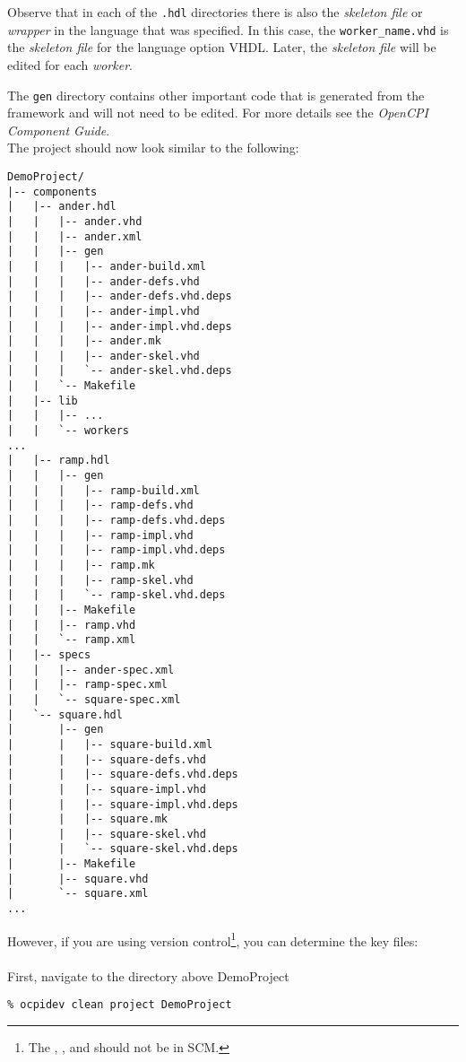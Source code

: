 Observe that in each of the \verb+.hdl+ directories there is also the \textit{skeleton file} or \textit{wrapper} in the language that was specified. In this case, the \verb+worker_name.vhd+ is the \textit{skeleton file} for the language option VHDL. Later, the \textit{skeleton file} will be edited for each \textit{worker}.\newline

The \verb+gen+ directory contains other important code that is generated from the framework and will not need to be edited. For more details see the \textit{OpenCPI Component Guide}.\\

\bstart
The project should now look similar to the following:
\begin{verbatim}
DemoProject/
|-- components
|   |-- ander.hdl
|   |   |-- ander.vhd
|   |   |-- ander.xml
|   |   |-- gen
|   |   |   |-- ander-build.xml
|   |   |   |-- ander-defs.vhd
|   |   |   |-- ander-defs.vhd.deps
|   |   |   |-- ander-impl.vhd
|   |   |   |-- ander-impl.vhd.deps
|   |   |   |-- ander.mk
|   |   |   |-- ander-skel.vhd
|   |   |   `-- ander-skel.vhd.deps
|   |   `-- Makefile
|   |-- lib
|   |   |-- ...
|   |   `-- workers
...
|   |-- ramp.hdl
|   |   |-- gen
|   |   |   |-- ramp-build.xml
|   |   |   |-- ramp-defs.vhd
|   |   |   |-- ramp-defs.vhd.deps
|   |   |   |-- ramp-impl.vhd
|   |   |   |-- ramp-impl.vhd.deps
|   |   |   |-- ramp.mk
|   |   |   |-- ramp-skel.vhd
|   |   |   `-- ramp-skel.vhd.deps
|   |   |-- Makefile
|   |   |-- ramp.vhd
|   |   `-- ramp.xml
|   |-- specs
|   |   |-- ander-spec.xml
|   |   |-- ramp-spec.xml
|   |   `-- square-spec.xml
|   `-- square.hdl
|       |-- gen
|       |   |-- square-build.xml
|       |   |-- square-defs.vhd
|       |   |-- square-defs.vhd.deps
|       |   |-- square-impl.vhd
|       |   |-- square-impl.vhd.deps
|       |   |-- square.mk
|       |   |-- square-skel.vhd
|       |   `-- square-skel.vhd.deps
|       |-- Makefile
|       |-- square.vhd
|       `-- square.xml
...
\end{verbatim}
\bend
\bstart
However, if you are using version control\footnote{The , , and  should not be in SCM.}, you can determine the key files:
\\\\
First, navigate to the directory above DemoProject

\forceindent\verb+% ocpidev clean project DemoProject+\\
\OcpidevClean

